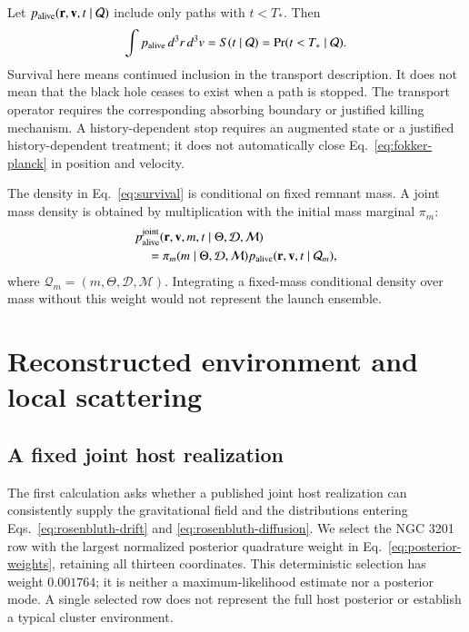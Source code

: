 \documentclass[aps,prd,reprint,amsmath,amssymb,superscriptaddress,nofootinbib,longbibliography,floatfix]{revtex4-2}
\begin{document}
Let $p_{\rm alive}(\mathbf r,\mathbf v,t\mid\mathcal Q)$ include only paths with $t<T_*$. Then
\begin{equation}
\int p_{\rm alive}\,d^3r\,d^3v
=S(t\mid\mathcal Q)
=\Pr(t<T_*\mid\mathcal Q).
\label{eq:survival}
\end{equation}
Survival here means continued inclusion in the transport description. It does not mean that the black hole ceases to exist when a path is stopped. The transport operator requires the corresponding absorbing boundary or justified killing mechanism. A history-dependent stop requires an augmented state or a justified history-dependent treatment; it does not automatically close Eq.~\eqref{eq:fokker-planck} in position and velocity.

The density in Eq.~\eqref{eq:survival} is conditional on fixed remnant mass. A joint mass density is obtained by multiplication with the initial mass marginal $\pi_m$:
\begin{align}
&p_{\rm alive}^{\rm joint}(\mathbf r,\mathbf v,m,t
\mid\Theta,\mathcal D,\mathcal M)\nonumber\\
&\quad=\pi_m(m\mid\Theta,\mathcal D,\mathcal M)
p_{\rm alive}(\mathbf r,\mathbf v,t
\mid\mathcal Q_m),
\label{eq:mass-mixture}
\end{align}
where $\mathcal Q_m=(m,\Theta,\mathcal D,\mathcal M)$.
Integrating a fixed-mass conditional density over mass without this weight would not represent the launch ensemble.

\section{Reconstructed environment and local scattering}\label{sec:local-calculation}

\subsection{A fixed joint host realization}

The first calculation asks whether a published joint host realization can consistently supply the gravitational field and the distributions entering Eqs.~\eqref{eq:rosenbluth-drift} and \eqref{eq:rosenbluth-diffusion}. We select the NGC 3201 row with the largest normalized posterior quadrature weight in Eq.~\eqref{eq:posterior-weights}, retaining all thirteen coordinates. This deterministic selection has weight $0.001764$; it is neither a maximum-likelihood estimate nor a posterior mode. A single selected row does not represent the full host posterior or establish a typical cluster environment.
\end{document}
